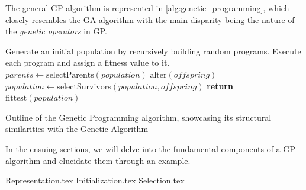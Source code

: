   The general GP algorithm is represented in \vref{alg:genetic_programming}, which
  closely resembles the GA algorithm with the main disparity being the nature of
  the \textit{genetic operators} in GP.

  \begin{algorithm}[ht!]
    \begin{algorithmic}[1]
      \State Generate an initial population by recursively building random programs.
      \State Execute each program and assign a fitness value to it.
      \Repeat
        \State \(\mathit{parents} \gets \mathrm{selectParents}(\mathit{population})\) 
        \State \(\mathrm{alter}(\mathit{offspring})\) 
        \State \(\mathit{population} \gets \mathrm{selectSurvivors}(
          \mathit{population}, \mathit{offspring})\) 
      \State \textbf{return} \(\mathrm{fittest}(\mathit{population})\) 
    \end{algorithmic}
    \caption{
      Outline of the Genetic Programming algorithm, showcasing its structural 
      similarities with the Genetic Algorithm
    }
    \label{alg:genetic_programming}
  \end{algorithm}

  In the ensuing sections, we will delve into the fundamental components of a GP
  algorithm and elucidate them through an example.

  {Representation.tex}
  {Initialization.tex}
  {Selection.tex}
%
